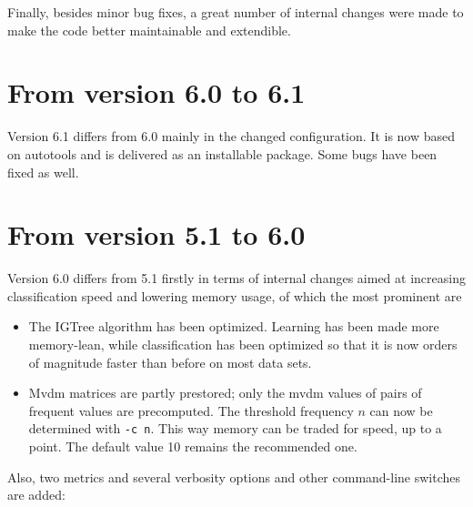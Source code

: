 \documentclass{book}
\begin{document}
Finally, besides minor bug fixes, a great number of internal changes
were made to make the code better maintainable and extendible.

\section{From version 6.0 to 6.1}

Version 6.1 differs from 6.0 mainly in the changed configuration.  It
is now based on autotools and is delivered as an installable package.
Some bugs have been fixed as well.

\section{From version 5.1 to 6.0}

Version 6.0 differs from 5.1 firstly in terms of internal changes
aimed at increasing classification speed and lowering memory usage, of
which the most prominent are

\begin{itemize}

\item The {\sc IGTree} algorithm has been optimized. Learning has been
  made more memory-lean, while classification has been optimized so
  that it is now orders of magnitude faster than before on most data sets.

\item {\sc Mvdm} matrices are partly prestored; only the {\sc mvdm}
  values of pairs of frequent values are precomputed. The threshold
  frequency $n$ can now be determined with {\tt -c n}. This way memory
  can be traded for speed, up to a point. The default value 10 remains
  the recommended one.

\end{itemize}

Also, two metrics and several verbosity options and other command-line
switches are added:
\end{document}
